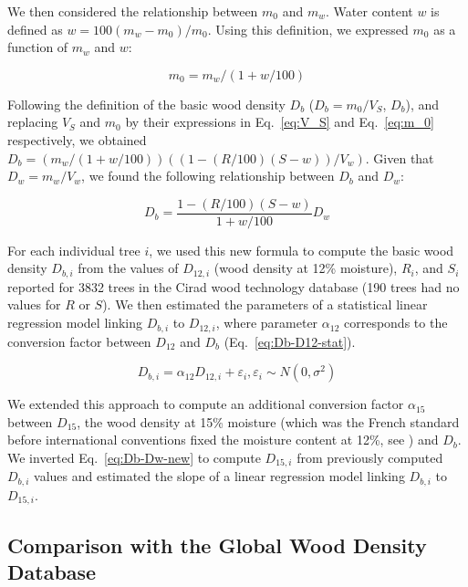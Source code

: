 \documentclass[a4paper, 12pt, leqno, dvipsnames]{article}\usepackage[]{graphicx}\usepackage[]{color}
\begin{document}
We then considered the relationship between $m_0$ and $m_w$. Water content $w$ is defined as $w=100(m_w-m_0)/m_0$. Using this definition, we expressed $m_0$ as a function of $m_w$ and $w$: 

\begin{equation}
  m_0=m_w/(1+w/100)
  \label{eq:m_0}
\end{equation}

Following the definition of the basic wood density $D_b$ ($D_b=m_0/V_S$, $D_b$), and replacing $V_S$ and $m_0$ by their expressions in Eq.~\ref{eq:V_S} and Eq.~\ref{eq:m_0} respectively, we obtained $D_b=(m_w/(1+w/100))((1-(R/100)(S-w))/V_w)$. Given that $D_w=m_w/V_w$, we found the following relationship between $D_b$ and $D_w$:

\begin{equation}
  D_b=\frac{1-(R/100)(S-w)}{1+w/100}D_w
  \label{eq:Db-Dw-new}
\end{equation}

For each individual tree $i$, we used this new formula to compute the basic wood density $D_{b,i}$ from the values of $D_{12,i}$ (wood density at 12\% moisture), $R_i$, and $S_i$ reported for 3832 trees in the Cirad wood technology database (190 trees had no values for $R$ or $S$). We then estimated the parameters of a statistical linear regression model linking $D_{b,i}$ to $D_{12,i}$, where parameter $\alpha_{12}$ corresponds to the conversion factor between $D_{12}$ and $D_b$ (Eq.~\ref{eq:Db-D12-stat}).

\begin{equation}
  D_{b,i}=\alpha_{12} D_{12,i} + \varepsilon_i, \varepsilon_i \sim N(0,\sigma^2)
  \label{eq:Db-D12-stat}
\end{equation}

We extended this approach to compute an additional conversion factor $\alpha_{15}$ between $D_{15}$, the wood density at 15\% moisture (which was the French standard before international conventions fixed the moisture content at 12\%, see \citet{Sallenave1955}) and $D_b$. We inverted Eq.~\ref{eq:Db-Dw-new} to compute $D_{15,i}$ from previously computed $D_{b,i}$ values and estimated the slope of a linear regression model linking $D_{b,i}$ to $D_{15,i}$.

\subsection{Comparison with the Global Wood Density Database}
\end{document}
